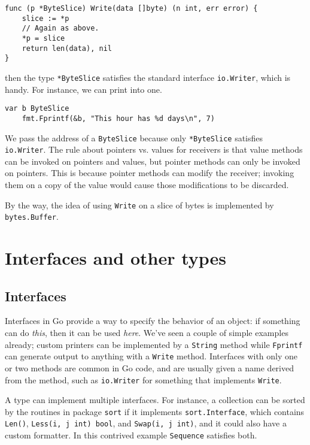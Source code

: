 \begin{Verbatim}[frame=single]
func (p *ByteSlice) Write(data []byte) (n int, err error) {
    slice := *p
    // Again as above.
    *p = slice
    return len(data), nil
}
\end{Verbatim}

then the type \texttt{*ByteSlice} satisfies the standard interface
\texttt{io.Writer}, which is handy. For instance, we can print into one.

\begin{Verbatim}[frame=single]
    var b ByteSlice
    fmt.Fprintf(&b, "This hour has %d days\n", 7)
\end{Verbatim}

We pass the address of a \texttt{ByteSlice} because only
\texttt{*ByteSlice} satisfies \texttt{io.Writer}. The rule about
pointers vs. values for receivers is that value methods can be invoked
on pointers and values, but pointer methods can only be invoked on
pointers. This is because pointer methods can modify the receiver;
invoking them on a copy of the value would cause those modifications to
be discarded.

By the way, the idea of using \texttt{Write} on a slice of bytes is
implemented by \texttt{bytes.Buffer}.

\section*{Interfaces and other types}

\subsection*{Interfaces}

Interfaces in Go provide a way to specify the behavior of an object: if
something can do \emph{this}, then it can be used \emph{here}. We've
seen a couple of simple examples already; custom printers can be
implemented by a \texttt{String} method while \texttt{Fprintf} can
generate output to anything with a \texttt{Write} method. Interfaces
with only one or two methods are common in Go code, and are usually
given a name derived from the method, such as \texttt{io.Writer} for
something that implements \texttt{Write}.

A type can implement multiple interfaces. For instance, a collection can
be sorted by the routines in package \texttt{sort} if it implements
\texttt{sort.Interface}, which contains \texttt{Len()},
\texttt{Less(i, j int) bool}, and \texttt{Swap(i, j int)}, and it could
also have a custom formatter. In this contrived example
\texttt{Sequence} satisfies both.

